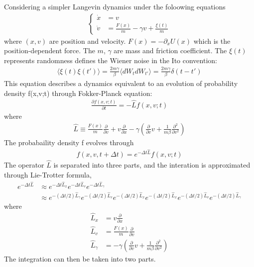 \documentclass[10pt]{article}
\begin{document}
\noindent Considering a simpler Langevin dynamics under the foloowing equations
\begin{align*}
  \begin{cases}
    \dot{x}&=v \\
    \dot{v}&=\frac{F(x)}{m}-\gamma v+\frac{\xi(t)}{m}
  \end{cases}
\end{align*}
where $(x,v)$ are position and velocity. $F(x)=-\partial_x U(x)$ which is the position-dependent force. The $m$, $\gamma$ are mass and friction coefficient. The $\xi(t)$ represents randomness defines the Wiener noise in the Ito convention:
\begin{align*}
\langle\xi(t)\xi(t')\rangle=\frac{2m\gamma}{\beta}\langle dW_tdW_{t'}\rangle=\frac{2m\gamma}{\beta}\delta(t-t')
\end{align*}
This equation describes a dynamics equivalent to an evolution of probability density f(x,v;t) through Fokker-Planck equation:
\begin{align*}
\frac{\partial f(x,v;t)}{\partial t}=-\hat{L}f(x,v;t)
\end{align*}
where
\begin{align*}
\hat{L}\equiv\frac{F(x)}{m}\frac{\partial}{\partial v}+v\frac{\partial}{\partial x}-\gamma\left(\frac{\partial}{\partial v}v+\frac{1}{m\beta}\frac{\partial^2}{\partial v^2}\right)
\end{align*}
The probabaility density f evolves through
\begin{align*}
f(x,v, t+\Delta t)=e^{-\Delta t\hat{L}}f(x,v;t)
\end{align*}
The operator $\hat{L}$ is separated into three parts, and the interation is approximated through Lie-Trotter formula,
\begin{align*}
e^{-\Delta t\hat{L}}&\approx e^{-\Delta t\hat{L}_x}e^{-\Delta t\hat{L}_v}e^{-\Delta t\hat{L}_{\gamma}} \\
&\approx e^{-(\Delta t/2)\hat{L}_{\gamma}}e^{-(\Delta t/2)\hat{L}_v}e^{-(\Delta t/2)\hat{L}_x}e^{-(\Delta t/2)\hat{L}_x}e^{-(\Delta t/2)\hat{L}_v}e^{-(\Delta t/2)\hat{L}_{\gamma}}
\end{align*}
where
\begin{align*}
\hat{L}_x&=v\frac{\partial}{\partial x} \\
\hat{L}_v&=\frac{F(x)}{m}\frac{\partial}{\partial v} \\
\hat{L}_{\gamma}&=-\gamma\left(\frac{\partial}{\partial v}v+\frac{1}{m\beta}\frac{\partial^2}{\partial v^2}\right)
\end{align*}
The integration can then be taken into two parts.
\end{document}
